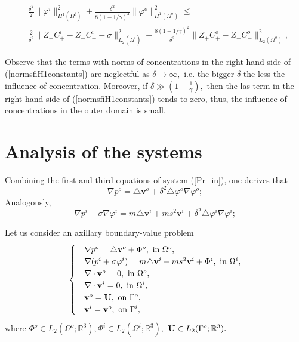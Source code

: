 \documentclass{amsart}
\begin{document}
\begin{equation}\label{normsfiH1constants}
\begin{aligned}
&\frac{\delta^2}{2}\|\varphi^i\|^2_{H^1(\Omega^i)}+\frac{\delta^2}{8(1-1/{\gamma})^2}\|\varphi^o\|^2_{H^1(\Omega^o)}\leq \\
&\frac{2}{\delta^2}\|Z_{+}C^i_{+}-Z_{-}C^i_{-}-\sigma\|^2_{L_2(\Omega^i)} +\frac{8(1-1/{\gamma})^2}{\delta^2}\|Z_{+}C^o_{+}-Z_{-}C^o_{-}\|^2_{L_2(\Omega^o)},
\end{aligned}
\end{equation}

\begin{remark}
Observe that the terms with norms of concentrations in the right-hand side of (\ref{normsfiH1constants}) are neglectful as $\delta\rightarrow\infty,$ i.e. the bigger $\delta$ the less the influence of concentration. Moreover, if $\delta\gg\left(1-\frac{1}{\gamma}\right),$ then the las term in the right-hand side of (\ref{normsfiH1constants}) tends to zero, thus, the influence of concentrations in the outer domain is small.
\end{remark}
\section{Analysis of the systems}

Combining the first and third equations of system (\ref{Pr_in}), one derives that
$$\nabla p^o=\triangle \mathbf{v}^{o}+\delta^2\triangle \varphi^o\nabla \varphi^o;$$
Analogously,
$$\nabla p^i+\sigma\nabla \varphi^i=m\triangle \mathbf{v}^{i}+ms^2\mathbf{v}^{i}+\delta^2\triangle \varphi^i\nabla \varphi^i;$$

Let us consider an axillary boundary-value problem
\begin{equation}\label{auxv}
\begin{cases}
&\nabla p^o=\triangle \mathbf{\bf v}^{o}+\Phi^o, \text { in } \Omega^o,\\
&\nabla (p^i+\sigma\varphi^i)=m\triangle \mathbf{\bf v}^{i}-ms^2{\bf v}^i+\Phi^i, \text { in } \Omega^i,\\
&\nabla\cdot{\bf v}^o=0,\text { in } \Omega^o,\\
&\nabla\cdot{\bf v}^i=0,\text { in } \Omega^i,\\
&{\bf v}^o={\bf U}, \text { on } \Gamma^o,\\
&{\bf v}^i={\bf v}^o, \text { on } \Gamma^i,\\
\end{cases}
\end{equation}
where $\Phi^o\in L_2(\Omega^o;\mathbb{R}^3),\Phi^i\in L_2(\Omega^i;\mathbb{R}^3),$ ${\bf U}\in L_2(\Gamma^o;\mathbb{R}^3).$
\end{document}
